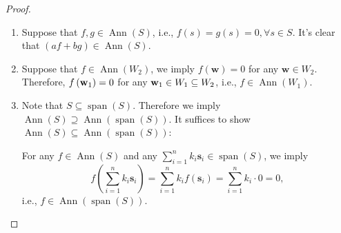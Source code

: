 \begin{proof}
\begin{enumerate}
  \item Suppose that \(f,g \in  \operatorname{Ann}\left( S\right)\), i.e., \(f\left( s\right)  = g\left( s\right)  = 0,\forall s \in  S\). It’s clear that \(({af} + {bg}) \in  \operatorname{Ann}\left( S\right)\).

  \item Suppose that \(f \in  \operatorname{Ann}\left( W_2\right)\), we imply \(f\left( \mathbf{w}\right)  = 0\) for any \(\mathbf{w} \in  W_2\). Therefore, \(f\left( {\bf w}_1\right)  = 0\) for any \({\bf w}_1 \in W_1 \subseteq  W_2\), i.e., \(f \in  \operatorname{Ann}\left( W_1\right)\).


  \item Note that \(S \subseteq  \operatorname{span}\left( S\right)\). Therefore we imply \(\operatorname{Ann}\left( S\right)  \supseteq  \operatorname{Ann}\left( {\operatorname{span}\left( S\right) }\right)\). It suffices to show \(\operatorname{Ann}\left( S\right)  \subseteq  \operatorname{Ann}\left( {\operatorname{span}\left( S\right) }\right)\):

  For any \(f \in  \operatorname{Ann}\left( S\right)\) and any \(\sum_{i = 1}^n{k}_{i}{\mathbf{s}}_{i} \in  \operatorname{span}\left( S\right)\), we imply
  \[
  f\left( \sum_{i = 1}^n{k}_{i}{\mathbf{s}}_{i}\right)  = \sum_{i = 1}^n{k}_{i}f\left( {\mathbf{s}}_{i}\right) = \sum_{i = 1}^n{k}_{i} \cdot  0 = 0,
  \]
  i.e., \(f \in  \operatorname{Ann}\left( {\operatorname{span}\left( S\right) }\right)\).


\end{enumerate}
\end{proof}
